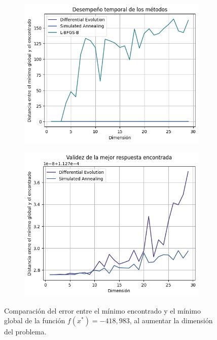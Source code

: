 \documentclass[10pt,a4paper,twocolumn]{article}
\begin{document}
		\begin{figure}[htb!]
			\centering
			\begin{subfigure}{.492\linewidth}
				\includegraphics[height=.95\linewidth, width=.95\linewidth]{assets/ev_comp}
				\caption{}
				\label{fig:3a}
			\end{subfigure}
			\begin{subfigure}{.492\linewidth}
				\includegraphics[height=.95\linewidth, width=.95\linewidth]{assets/ev_comp2}
				\caption{}
				\label{fig:3b}
			\end{subfigure}
			\caption{Comparación del error entre el mínimo encontrado y el mínimo global de la función $f(x^*) = -418,983$, al aumentar la dimensión del problema.}
			\label{fig:3}
		\end{figure}
		
\end{document}
